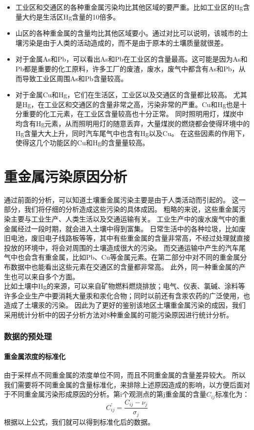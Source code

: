 \documentclass[a4paper]{article}
\begin{document}
\begin{itemize}
\item 工业区和交通区的各种重金属污染均比其他区域的要严重。比如工业区的Hg含量大约是生活区Hg含量的10倍多。                               
\item 山区的各种重金属的含量均比其他区域要小。通过对比可以说明，该城市的土壤污染是由于人类的活动造成的，而不是由于原本的土壤质量就很差。  
\item 对于金属As和Pb，可以看出As和Pb在工业区的含量最高。这可能是因为As和Pb都是重要的化工原料，许多工厂的废渣，废水，废气中都含有As和Pb，从而导致工业区周围As和Pb含量较高。
\item 对于金属Cu和Hg，它们在生活区，工业区以及交通区的含量都比较高。
尤其是Hg，在工业区和交通区的含量非常之高，污染非常的严重。Cu和Hg也是十分重要的化工元素，在工业区含量较高也十分正常。
同时照明用灯，煤炭中均含有Hg元素，从而照明用灯的随意丢弃，大量煤炭的燃烧都会使得环境中的Hg含量大大上升，同时汽车尾气中也含有Hg以及Cu。
在这些因素的作用下，使得这几个功能区的Cu和Hg的含量量较高。
\end{itemize}


\part{重金属污染原因分析}
通过前面的分析，可以知道土壤重金属污染主要是由于人类活动而引起的。
这一部分，我们将仔细的分析造成这些污染的具体成因。
粗略的来说，这些重金属污染主要与工业生产、人类生活以及交通运输有关。
工业生产中的废水废气中的重金属经过一段时期，就会进入土壤中得到富集。
日常生活中的各种垃圾，比如废旧电池，废旧电子线路板等等，其中有些重金属的含量非常高，不经过处理就直接投放的环境中，将会对周围的土壤造成很大的污染。
而交通运输中产生的汽车尾气中也会含有重金属，比如Pb、Cu等金属元素。在第二部分中对不同的重金属分布数据中也能看出这些元素在交通区的含量都非常高。
此外，同一种重金属的产生也可以来自多个方面。               \\
比如土壤中Hg的来源，可以来自矿物燃料燃烧排放；电气、仪表、氯碱、涂料等许多企业生产中要消耗大量汞和汞化合物；同时以前还有含汞农药的广泛使用，也造成了土壤汞的污染。
\indent 因此为了更好的鉴别该地区土壤重金属污染的成因，我们采用统计分析中的因子分析方法对8种重金属的可能污染原因进行统计分析。
\section{数据的预处理}
\subsection{重金属浓度的标准化}
\indent 由于采样点不同重金属的浓度单位不同，而且不同重金属的含量差异较大。
所以我们需要将不同重金属的含量标准化，来排除上述原因造成的影响，以方便后面对于不同重金属污染形成原因的分析。第i个观测点的第j重金属的含量$C_{ij}$标准化为：
\begin{equation}
C_{ij}^{\prime}=\frac{C_{ij}-\nu_{j}}{\sigma_{j}}
\end{equation}
根据以上公式，我们就可以得到标准化后的数据。
\end{document}
